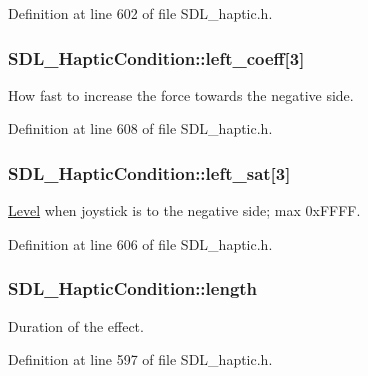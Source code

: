 Definition at line 602 of file S\-D\-L\-\_\-haptic.\-h.

\hypertarget{struct_s_d_l___haptic_condition_a2adf52c32f60f0b6826b1e3add2eae7a}{
\subsubsection[{left\-\_\-coeff}]{ S\-D\-L\-\_\-\-Haptic\-Condition\-::left\-\_\-coeff\mbox{[}3\mbox{]}}}\label{struct_s_d_l___haptic_condition_a2adf52c32f60f0b6826b1e3add2eae7a}
How fast to increase the force towards the negative side. 

Definition at line 608 of file S\-D\-L\-\_\-haptic.\-h.

\hypertarget{struct_s_d_l___haptic_condition_a953448774c40818a4f47c6efea21124d}{
\subsubsection[{left\-\_\-sat}]{ S\-D\-L\-\_\-\-Haptic\-Condition\-::left\-\_\-sat\mbox{[}3\mbox{]}}}\label{struct_s_d_l___haptic_condition_a953448774c40818a4f47c6efea21124d}
\hyperlink{class_level}{Level} when joystick is to the negative side; max 0x\-F\-F\-F\-F. 

Definition at line 606 of file S\-D\-L\-\_\-haptic.\-h.

\hypertarget{struct_s_d_l___haptic_condition_ad0efb0a6ddc20f058e87199eaaa95978}{
\subsubsection[{length}]{ S\-D\-L\-\_\-\-Haptic\-Condition\-::length}}\label{struct_s_d_l___haptic_condition_ad0efb0a6ddc20f058e87199eaaa95978}
Duration of the effect. 

Definition at line 597 of file S\-D\-L\-\_\-haptic.\-h.

